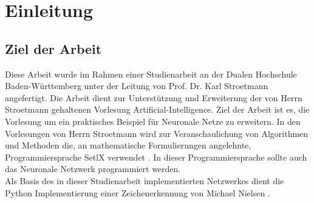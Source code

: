 \chapter{Einleitung}

\section{Ziel der Arbeit}
Diese Arbeit wurde im Rahmen einer Studienarbeit an der Dualen Hochschule Baden-Württemberg unter der Leitung von Prof. Dr. Karl Stroetmann angefertigt. Die Arbeit dient zur Unterstützung und Erweiterung der von Herrn Stroetmann gehaltenen Vorlesung \glqq Artificial-Intelligence\grqq \cite{stroetmann:2017}. Ziel der Arbeit ist es, die Vorlesung um ein praktisches Beispiel für Neuronale Netze zu erweitern. In den Vorlesungen von Herrn Stroetmann wird zur Veranschaulichung von Algorithmen und Methoden die, an mathematische Formulierungen angelehnte, Programmiersprache SetlX verwendet \cite{setlx:2017}. In dieser Programmiersprache sollte auch das Neuronale Netzwerk programmiert werden. \\
Als Basis des in dieser Studienarbeit implementierten Netzwerkes dient die Python Implementierung einer Zeichenerkennung von Michael Nielsen \cite{nielson:2017}.

